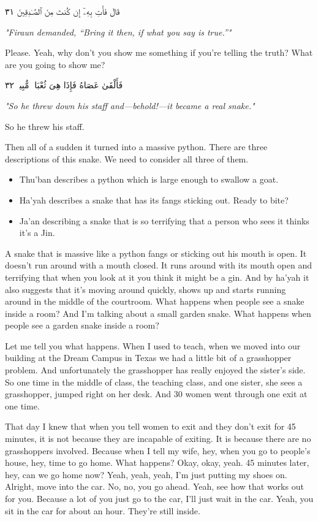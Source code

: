 \documentclass[12pt]{article}
\begin{document}
\textarabic{قَالَ فَأْتِ بِهِۦٓ إِن كُنتَ مِنَ ٱلصَّـٰدِقِينَ ٣١}

\textit{"Firaun demanded, “Bring it then, if what you say is true.”"}

Please. Yeah, why don't you show me something if you're telling the truth? What are you going to show me? 

\textarabic{فَأَلْقَىٰ عَصَاهُ فَإِذَا هِىَ ثُعْبَانٌۭ مُّبِينٌۭ ٣٢}

\textit{"So he threw down his staff and—behold!—it became a real snake."}

So he threw his staff. 

Then all of a sudden it turned into a massive python. There are three descriptions of this snake. We need to consider all three of them. 

\begin{itemize}
    \item Thu'ban describes a python which is large enough to swallow a goat. 
    \item Ha'yah describes a snake that has its fangs sticking out. Ready to bite? 
    \item Ja'an describing a snake that is so terrifying that a person who sees it thinks it's a Jin. 
\end{itemize}

A snake that is massive like a python fangs or sticking out his mouth is open. It doesn't run around with a mouth closed. It runs around with its mouth open and terrifying that when you look at it you think it might be a gin. And by ha'yah it also suggests that it's moving around quickly, shows up and starts running around in the middle of the courtroom. What happens when people see a snake inside a room? And I'm talking about a small garden snake. What happens when people see a garden snake inside a room? 


Let me tell you what happens. When I used to teach, when we moved into our building at the Dream Campus in Texas we had a little bit of a grasshopper problem. And unfortunately the grasshopper has really enjoyed the sister's side. So one time in the middle of class, the teaching class, and one sister, she sees a grasshopper, jumped right on her desk. And 30 women went through one exit at one time. 


That day I knew that when you tell women to exit and they don't exit for 45 minutes, it is not because they are incapable of exiting. It is because there are no grasshoppers involved. Because when I tell my wife, hey, when you go to people's house, hey, time to go home. What happens? Okay, okay, yeah. 45 minutes later, hey, can we go home now? Yeah, yeah, yeah, I'm just putting my shoes on. Alright, move into the car. No, no, you go ahead. Yeah, see how that works out for you. Because a lot of you just go to the car, I'll just wait in the car. Yeah, you sit in the car for about an hour. They're still inside. 
\end{document}
